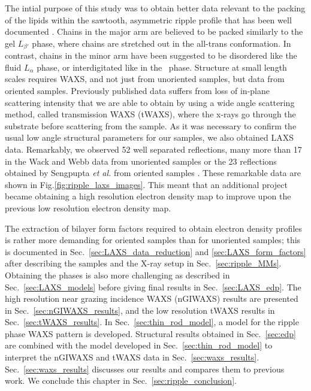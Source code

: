 The intial purpose of this study was to obtain better data relevant
to the packing of the lipids within the sawtooth, asymmetric ripple profile 
that has been well documented \cite{ref:Sun96,ref:Sengupta03}.
Chains in the major arm are believed to be packed similarly to the gel $L_{\beta'}$ phase,
where chains are stretched out in the all-trans conformation. 
In contrast, chains in the minor arm have been suggested to be disordered
like the fluid $L_\alpha$ phase, or interdigitated like in the \LI\ phase. 
Structure at small length scales requires WAXS, and not just from unoriented samples, 
but data from oriented samples.  Previously published data suffers from loss 
of in-plane scattering intensity that we are able to obtain by using a wide 
angle scattering method, called  transmission WAXS (tWAXS), where the x-rays 
go through the substrate before scattering from the sample.  As it was 
necessary to confirm the usual low angle structural parameters for our 
samples, we also obtained LAXS data.  Remarkably, we observed 52 well 
separated reflections, many more than 17 in the Wack and Webb data from unoriented samples
\cite{ref:Wack89} or the 23 reflections obtained by Sengpupta \textit{et al.}
from oriented samples \cite{ref:Sengupta99}.  
These remarkable data are shown in Fig.\ref{fig:ripple_laxs_images}.  
This meant that an additional project became obtaining a high resolution electron density map 
to improve upon the previous low resolution electron density map.

The extraction of bilayer form factors required to obtain electron density 
profiles is rather more demanding for oriented samples than for unoriented 
samples; this is documented in Sec.~\ref{sec:LAXS_data_reduction} 
and \ref{sec:LAXS_form_factors} after describing the samples 
and the X-ray setup in Sec.~\ref{sec:ripple_MMs}.  
Obtaining the phases is also more 
challenging as described in Sec.~\ref{sec:LAXS_models} before giving final results in 
Sec.~\ref{sec:LAXS_edp}.  
The high resolution near grazing incidence WAXS (nGIWAXS) results are presented 
in Sec.~\ref{sec:nGIWAXS_results},
and the low resolution tWAXS results in Sec.~\ref{sec:tWAXS_results}.
In Sec.~\ref{sec:thin_rod_model}, a model for the ripple phase WAXS pattern 
is developed.
Structural results obtained in Sec.~\ref{sec:edp} are combined with the model 
developed in Sec.~\ref{sec:thin_rod_model} to interpret the nGIWAXS and tWAXS data
in Sec.~\ref{sec:waxs_results}. 
Sec.~\ref{sec:waxs_results} discusses our results and compares them to previous work.
We conclude this chapter in Sec.~\ref{sec:ripple_conclusion}.

